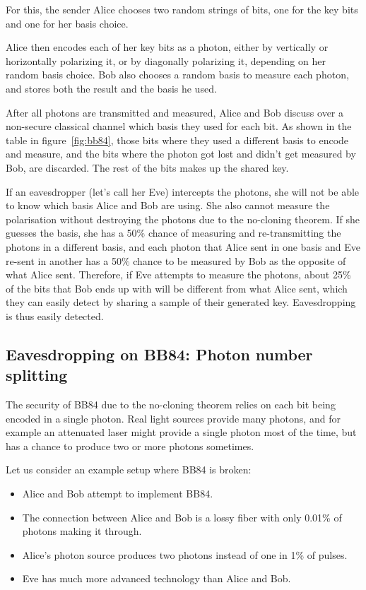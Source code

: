 \documentclass[12pt]{article}
\begin{document}
For this, the sender Alice chooses two random strings of bits, one for the key bits and one for her basis choice.

Alice then encodes each of her key bits as a photon, either by vertically or horizontally polarizing it, or by diagonally polarizing it, depending on her random basis choice.
Bob also chooses a random basis to measure each photon, and stores both the result and the basis he used.

After all photons are transmitted and measured, Alice and Bob discuss over a non-secure classical channel which basis they used for each bit.
As shown in the table in figure~\ref{fig:bb84}, those bits where they used a different basis to encode and measure, and the bits where the photon got lost and didn't get measured by Bob, are discarded.
The rest of the bits makes up the shared key.

If an eavesdropper (let's call her Eve) intercepts the photons, she will not be able to know which basis Alice and Bob are using.
She also cannot measure the polarisation without destroying the photons due to the no-cloning theorem.
If she guesses the basis, she has a 50\% chance of measuring and re-transmitting the photons in a different basis, and each photon that Alice sent in one basis and Eve re-sent in another has a 50\% chance to be measured by Bob as the opposite of what Alice sent.
Therefore, if Eve attempts to measure the photons, about 25\% of the bits that Bob ends up with will be different from what Alice sent, which they can easily detect by sharing a sample of their generated key.
Eavesdropping is thus easily detected.

\subsection{Eavesdropping on BB84: Photon number splitting}

The security of BB84 due to the no-cloning theorem relies on each bit being encoded in a single photon.
Real light sources provide many photons, and for example an attenuated laser might provide a single photon most of the time, but has a chance to produce two or more photons sometimes.

Let us consider an example setup where BB84 is broken:
\begin{itemize}
	\item Alice and Bob attempt to implement BB84.
	\item The connection between Alice and Bob is a lossy fiber with only 0.01\% of photons making it through.
	\item Alice's photon source produces two photons instead of one in 1\% of pulses.
	\item Eve has much more advanced technology than Alice and Bob.
\end{itemize}
\end{document}
